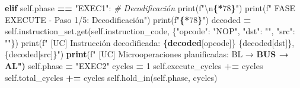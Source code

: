 \documentclass[12pt,oneside]{templates/unerthesis}
\newenvironment{Shaded}{\begin{snugshade}}{\end{snugshade}}
\newcommand{\BuiltInTok}[1]{#1}
\newcommand{\CharTok}[1]{\textcolor[rgb]{0.31,0.60,0.02}{#1}}
\newcommand{\CommentTok}[1]{\textcolor[rgb]{0.56,0.35,0.01}{\textit{#1}}}
\newcommand{\ControlFlowTok}[1]{\textcolor[rgb]{0.13,0.29,0.53}{\textbf{#1}}}
\newcommand{\DecValTok}[1]{\textcolor[rgb]{0.00,0.00,0.81}{#1}}
\newcommand{\ErrorTok}[1]{\textcolor[rgb]{0.64,0.00,0.00}{\textbf{#1}}}
\newcommand{\NormalTok}[1]{#1}
\newcommand{\OperatorTok}[1]{\textcolor[rgb]{0.81,0.36,0.00}{\textbf{#1}}}
\newcommand{\SpecialCharTok}[1]{\textcolor[rgb]{0.81,0.36,0.00}{\textbf{#1}}}
\newcommand{\SpecialStringTok}[1]{\textcolor[rgb]{0.31,0.60,0.02}{#1}}
\newcommand{\StringTok}[1]{\textcolor[rgb]{0.31,0.60,0.02}{#1}}
\newcommand{\VariableTok}[1]{\textcolor[rgb]{0.00,0.00,0.00}{#1}}
\begin{document}
\begin{Shaded}
\begin{Highlighting}[]
        \ControlFlowTok{elif} \VariableTok{self}\NormalTok{.phase }\OperatorTok{==} \StringTok{"EXEC1"}\NormalTok{:  }\CommentTok{\# Decodificación}
            \BuiltInTok{print}\NormalTok{(}\SpecialStringTok{f"}\CharTok{\textbackslash{}n}\SpecialCharTok{\{}\StringTok{\textquotesingle{}{-}\textquotesingle{}}\OperatorTok{*}\DecValTok{78}\SpecialCharTok{\}}\SpecialStringTok{"}\NormalTok{)}
            \BuiltInTok{print}\NormalTok{(}\SpecialStringTok{f"  FASE EXECUTE {-} Paso 1/5: Decodificación"}\NormalTok{)}
            \BuiltInTok{print}\NormalTok{(}\SpecialStringTok{f"}\SpecialCharTok{\{}\StringTok{\textquotesingle{}{-}\textquotesingle{}}\OperatorTok{*}\DecValTok{78}\SpecialCharTok{\}}\SpecialStringTok{"}\NormalTok{)}
\NormalTok{            decoded }\OperatorTok{=} \VariableTok{self}\NormalTok{.instruction\_set.get(}\VariableTok{self}\NormalTok{.instruction\_code, }
\NormalTok{            \{}\StringTok{"opcode"}\NormalTok{: }\StringTok{"NOP"}\NormalTok{, }\StringTok{"dst"}\NormalTok{: }\StringTok{""}\NormalTok{, }\StringTok{"src"}\NormalTok{: }\StringTok{""}\NormalTok{\})}
            \BuiltInTok{print}\NormalTok{(}\SpecialStringTok{f"  [UC] Instrucción decodificada:}
\ErrorTok{            \{decoded}\NormalTok{[}\StringTok{\textquotesingle{}opcode\textquotesingle{}}\NormalTok{]\} \{decoded[}\StringTok{\textquotesingle{}dst\textquotesingle{}}\NormalTok{]\},\{decoded[}\StringTok{\textquotesingle{}src\textquotesingle{}}\NormalTok{]\}}\StringTok{")}
\ErrorTok{            print}\NormalTok{(}\SpecialStringTok{f"  [UC] Microoperaciones planificadas: BL → }
\ErrorTok{            BUS → AL")}
            \VariableTok{self}\NormalTok{.phase }\OperatorTok{=} \StringTok{"EXEC2"}
\NormalTok{            cycles }\OperatorTok{=} \DecValTok{1}
            \VariableTok{self}\NormalTok{.execute\_cycles }\OperatorTok{+=}\NormalTok{ cycles}
            \VariableTok{self}\NormalTok{.total\_cycles }\OperatorTok{+=}\NormalTok{ cycles}
            \VariableTok{self}\NormalTok{.hold\_in(}\VariableTok{self}\NormalTok{.phase, cycles)}
        

\end{Highlighting}
\end{Shaded}
\end{document}
